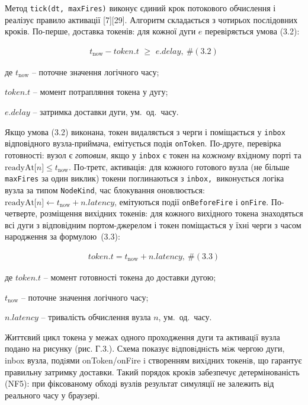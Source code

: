 \documentclass[
]{article}
\newcommand{\passthrough}[1]{#1}
\begin{document}
Метод
\passthrough{\lstinline!tick!}\passthrough{\lstinline!(!}\passthrough{\lstinline!dt!}\passthrough{\lstinline!,!}\passthrough{\lstinline! !}\passthrough{\lstinline!maxFires!}\passthrough{\lstinline!)!}
виконує єдиний крок потокового обчислення і реалізує правило активації
{[}7{]}{[}29{]}. Алгоритм складається з чотирьох послідовних кроків.
По-перше, доставка токенів: для кожної дуги \(e\) перевіряється умова
(3.2):

\[\begin{array}{r}
t_{\text{now}} - token.t\mspace{6mu} \geq \mspace{6mu} e.delay,\ \#(3.2)
\end{array}\]

де \(t_{\text{now}}\) -- поточне значення логічного часу;

\(token.t\) -- момент потрапляння токена у дугу;

\(e.delay\) -- затримка доставки дуги, ум.~од.~часу.

Якщо умова (3.2) виконана, токен видаляється з черги і поміщається у
\passthrough{\lstinline!inbox!} відповідного вузла-приймача, емітується
подія \passthrough{\lstinline!onToken!}. По-друге, перевірка готовності:
вузол є \emph{готовим}, якщо у \passthrough{\lstinline!inbox!} є токен
на \emph{кожному} вхідному порті та
\(\text{readyAt}\lbrack n\rbrack \leq t_{\text{now}}\). По-третє,
активація: для кожного готового вузла (не більше
\passthrough{\lstinline!maxFires!} за один виклик) токени поглинаються з
\passthrough{\lstinline!inbox!}\passthrough{\lstinline!,!}\passthrough{\lstinline! !}виконується
логіка вузла за типом \passthrough{\lstinline!NodeKind!}, час блокування
оновлюється:
\(\text{readyAt}\lbrack n\rbrack \leftarrow t_{\text{now}} + n.latency\),
емітуються події \passthrough{\lstinline!onBeforeFire!} і
\passthrough{\lstinline!onFire!}. По-четверте, розміщення вихідних
токенів: для кожного вихідного токена знаходяться всі дуги з відповідним
портом-джерелом і токен поміщається у їхні черги з часом народження за
формулою~(3.3):

\[\begin{array}{r}
token.t = t_{\text{now}} + n.latency,\ \#(3.3)
\end{array}\]

де \(token.t\) -- момент готовності токена до доставки дугою;

\(t_{\text{now}}\) -- поточне значення логічного часу;

\(n.latency\) -- тривалість обчислення вузла \(n\), ум.~од.~часу.

Життєвий цикл токена у межах одного проходження дуги та активацiї вузла
подано на рисунку (рис. Г.3.). Схема показує вiдповiднiсть мiж чергою
дуги, inbox вузла, подiями onToken/onFire i створенням вихiдних токенiв,
що гарантує правильну затримку доставки. Такий порядок кроків забезпечує
детермінованість (NF5): при фіксованому обході вузлів результат
симуляції не залежить від реального часу у браузері.
\end{document}
